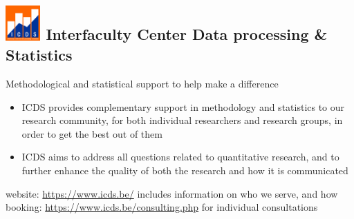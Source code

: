 \documentclass[]{article}
\begin{document}
\subsection{\texorpdfstring{\protect\includegraphics[width=0.10000\textwidth]{icds.png}
Interfaculty Center Data processing \&
Statistics}{ Interfaculty Center Data processing \& Statistics}}\label{interfaculty-center-data-processing-statistics}

Methodological and statistical support to help make a difference

\begin{itemize}
\item
  ICDS provides complementary support in methodology and statistics to
  our research community, for both individual researchers and research
  groups, in order to get the best out of them
\item
  ICDS aims to address all questions related to quantitative research,
  and to further enhance the quality of both the research and how it is
  communicated
\end{itemize}

website: \url{https://www.icds.be/} includes information on who we
serve, and how booking: \url{https://www.icds.be/consulting.php} for
individual consultations
\end{document}
